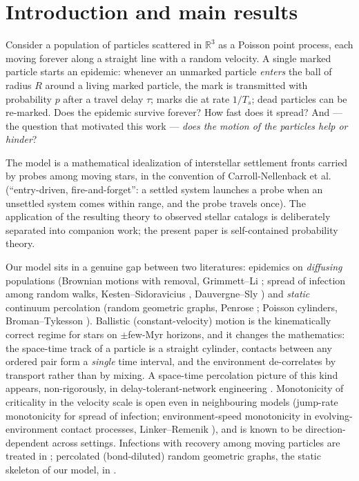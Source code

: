 \documentclass[11pt]{article}
\newcommand{\R}{\mathbb{R}}
\newcommand{\Ts}{T_s}
\begin{document}
\section{Introduction and main results}\label{sec:intro}

Consider a population of particles scattered in $\R^3$ as a Poisson point
process, each moving forever along a straight line with a random velocity.
A single marked particle starts an epidemic: whenever an unmarked particle
\emph{enters} the ball of radius $R$ around a living marked particle, the
mark is transmitted with probability $p$ after a travel delay $\tau$; marks
die at rate $1/\Ts$; dead particles can be re-marked. Does the epidemic
survive forever? How fast does it spread? And --- the question that motivated
this work --- \emph{does the motion of the particles help or hinder}?

The model is a mathematical idealization of interstellar settlement fronts
carried by probes among moving stars, in the convention of
Carroll-Nellenback et al.~\cite{cn19} (``entry-driven, fire-and-forget'':
a settled system launches a probe when an unsettled system comes within
range, and the probe travels once). The application of the resulting
theory to observed stellar catalogs is deliberately separated into
companion work; the present paper is self-contained probability theory.

Our model sits in a genuine gap between two literatures: epidemics on
\emph{diffusing} populations (Brownian motions with removal, Grimmett--Li
\cite{grimmettli}; spread of infection among random walks, Kesten--Sidoravicius
\cite{ks05,ks08}, Dauvergne--Sly \cite{dauvergnesly}) and \emph{static}
continuum percolation (random geometric graphs, Penrose \cite{penrose};
Poisson cylinders, Broman--Tykesson \cite{bromantykesson}). Ballistic
(constant-velocity) motion is the kinematically correct regime for stars on
$\pm$few-Myr horizons, and it changes the mathematics: the space-time track
of a particle is a straight cylinder, contacts between any ordered pair form
a \emph{single} time interval, and the environment de-correlates by transport
rather than by mixing. A space-time percolation picture of this kind appears,
non-rigorously, in delay-tolerant-network engineering \cite{hyytiaott}.
Monotonicity of criticality in the velocity scale is open even in
neighbouring models (jump-rate monotonicity for spread of infection;
environment-speed monotonicity in evolving-environment contact processes,
Linker--Remenik \cite{linkerremenik}), and is known to be
direction-dependent across settings. Infections with recovery among moving
particles are treated in \cite{baldassostauffer}; percolated (bond-diluted)
random geometric graphs, the static skeleton of our model, in
\cite{franceschetti,lichev}.
\end{document}
